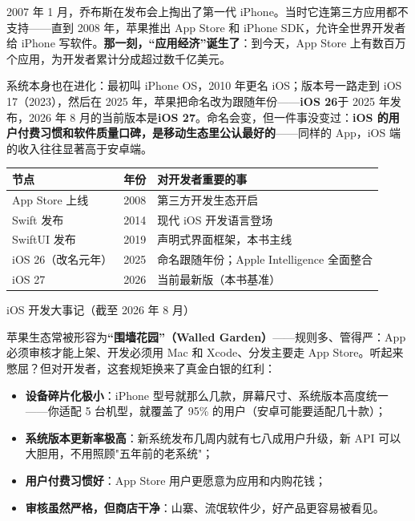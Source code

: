 


2007 年 1 月，乔布斯在发布会上掏出了第一代 iPhone。当时它连第三方应用都不支持——直到 2008 年，苹果推出 App Store 和 iPhone SDK，允许全世界开发者给 iPhone 写软件。\textbf{那一刻，“应用经济”诞生了}：到今天，App Store 上有数百万个应用，为开发者累计分成超过数千亿美元。

系统本身也在进化：最初叫 iPhone OS，2010 年更名 iOS；版本号一路走到 iOS 17（2023），然后在 2025 年，苹果把命名改为跟随年份——\textbf{iOS 26}于 2025 年发布，2026 年 8 月的当前版本是\textbf{iOS 27}。命名会变，但一件事没变过：\textbf{iOS 的用户付费习惯和软件质量口碑，是移动生态里公认最好的}——同样的 App，iOS 端的收入往往显著高于安卓端。

\begin{center}
\begin{tabularx}{\linewidth}{|X|X|X|}
\hline
\textbf{节点} & \textbf{年份} & \textbf{对开发者重要的事} \tabularnewline
\hline
App Store 上线 & 2008 & 第三方开发生态开启 \tabularnewline
Swift 发布 & 2014 & 现代 iOS 开发语言登场 \tabularnewline
SwiftUI 发布 & 2019 & 声明式界面框架，本书主线 \tabularnewline
iOS 26（改名元年） & 2025 & 命名跟随年份；Apple Intelligence 全面整合 \tabularnewline
iOS 27 & 2026 & 当前最新版（本书基准） \tabularnewline
\hline
\end{tabularx}
\end{center}

\begin{center}\small\color{gray}iOS 开发大事记（截至 2026 年 8 月）\end{center}


苹果生态常被形容为\textbf{“围墙花园”（Walled Garden）}——规则多、管得严：App 必须审核才能上架、开发必须用 Mac 和 Xcode、分发主要走 App Store。听起来憋屈？但对开发者，这套规矩换来了真金白银的红利：

\begin{itemize}
  \item \textbf{设备碎片化极小}：iPhone 型号就那么几款，屏幕尺寸、系统版本高度统一——你适配 5 台机型，就覆盖了 95\% 的用户（安卓可能要适配几十款）；
  \item \textbf{系统版本更新率极高}：新系统发布几周内就有七八成用户升级，新 API 可以大胆用，不用照顾"五年前的老系统"；
  \item \textbf{用户付费习惯好}：App Store 用户更愿意为应用和内购花钱；
  \item \textbf{审核虽然严格，但商店干净}：山寨、流氓软件少，好产品更容易被看见。
\end{itemize}

